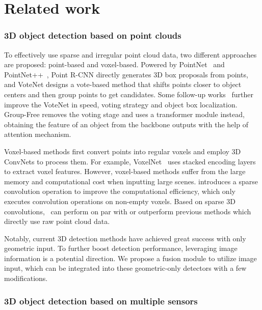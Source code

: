 \documentclass[runningheads]{llncs}
\begin{document}
\section{Related work}
\subsubsection{3D object detection based on point clouds} 

To effectively use sparse and irregular point cloud data, two different approaches are proposed: point-based and voxel-based. Powered by PointNet~\cite{qi2017pointnet} and PointNet++~\cite{qi2018pointnnetplus}, Point R-CNN \cite{shi2019pointrcnn} directly generates 3D box proposals from points, and VoteNet \cite{qi2019deep} designs a vote-based method that shifts points closer to object centers and then group points to get candidates. Some follow-up works~\cite{yang20203dssd,cheng2021back,zhang2020h3dnet,chen2020hierarchical,xie2021venet} further improve the VoteNet in speed, voting strategy and object box localization. Group-Free \cite{liu2021group} removes the voting stage and uses a transformer module instead, obtaining the feature of an object from the backbone outputs with the help of attention mechanism. 

Voxel-based methods first convert points into regular voxels and employ 3D ConvNets to process them. For example, VoxelNet~\cite{zhou2018voxelnet} uses stacked encoding layers to extract voxel features. However, voxel-based methods suffer from the large memory and computational cost when inputting large scenes. \cite{yan2018second,graham20183d} introduces a sparse convolution operation to improve the computational efficiency, which only executes convolution operations on non-empty voxels. Based on sparse 3D convolutions,~\cite{gwak2020generative,rukhovich2021fcaf3d,lang2019pointpillars,Deng2021VoxelRT,shi2020pv} can perform on par with or outperform previous methods which directly use raw point cloud data.

Notably, current 3D detection methods have achieved great success with only geometric input. To further boost detection performance, leveraging image information is a potential direction. We propose a fusion module to utilize image input, which can be integrated into these geometric-only detectors with a few modifications.

\subsubsection{3D object detection based on multiple sensors}
\end{document}
